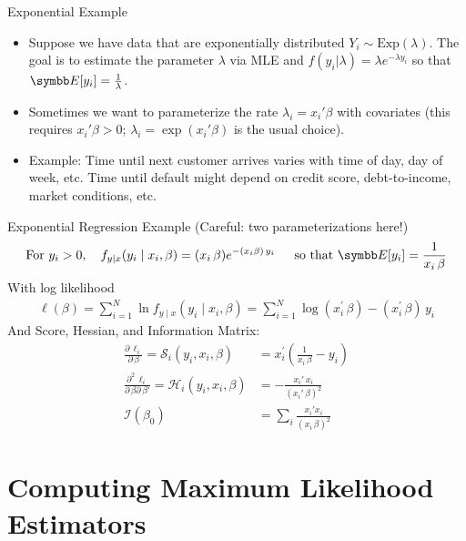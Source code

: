 \documentclass[aspectratio=169,11pt]{beamer}
\begin{document}
\begin{frame}{Exponential Example}
\begin{itemize}
\item Suppose we have data that are exponentially distributed $Y_i \sim \text{Exp}(\lambda)$. The goal is to estimate the parameter $\lambda$ via MLE and $f(y_i | \lambda) = \lambda e^{-\lambda y_i}$ so that $\E[y_i]=\frac{1}{\lambda}$.
\item Sometimes we want to parameterize the rate  $\lambda_i = x_i' \beta$ with covariates (this requires $x_i'\beta>0$; $\lambda_i=\exp(x_i'\beta)$ is the usual choice).
\item Example: Time until next customer arrives varies with time of day, day of week, etc. Time until default might depend on credit score, debt-to-income, market conditions, etc.
\end{itemize}
\end{frame}



\begin{frame}{Exponential Regression Example (Careful: two parameterizations here!)}
\begin{align*}
\text{For } y_i > 0, \quad f _ { y \mid x} ( y_i \mid x_i , \beta  ) =  (x_i \, \beta)e^{ - (x_i \beta )\, y_i }\, \quad  \text{ so that } \E[y_i] = \frac{1}{x_i\, \beta}
\end{align*}
With log likelihood
\begin{align*}
\ell( \beta ) = \sum _ { i = 1 } ^ { N } \ln f _ { y \mid x } \left( y _ { i } \mid x _ { i } , \beta \right) = \sum _ { i = 1 } ^ { N } \log(x _ { i } ^ { \prime }\, \beta) - \left( x _ { i } ^ { \prime }\, \beta \right)\, y _ { i } 
\end{align*}
And Score, Hessian, and Information Matrix:
\begin{align*}
\frac{\partial\, \ell_i}{\partial\, \beta} = \mathcal { S }_i ( y_i, x_i , \beta ) &=  x_i ^ { \prime } \left( \frac{1}{x_i\, \beta} - y_i \right)\\
\frac{\partial^2\, \ell_i}{\partial\, \beta \partial\, \beta'} = \mathcal { H }_i ( y_i , x_i , \beta ) &= - \frac{x_i'\, x_i}{(x_i'\, \beta)^2}\\
\mathcal { I } \left( \beta _ { 0 } \right) &= \sum_i \frac{x_i' x_i}{(x_i\, \beta)^2}
\end{align*}
\end{frame}


\section*{Computing Maximum Likelihood Estimators}
\end{document}

